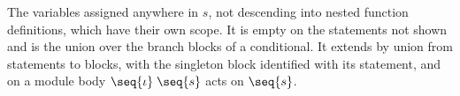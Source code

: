 The variables assigned anywhere in $s$, not descending into nested function definitions, which have their
own scope. It is empty on the statements not shown and is the union over the branch blocks of a
conditional. It extends by union from statements to blocks, with the singleton block identified with its
statement, and on a module body $\seq{\iota}\;\seq{s}$ acts on $\seq{s}$.
